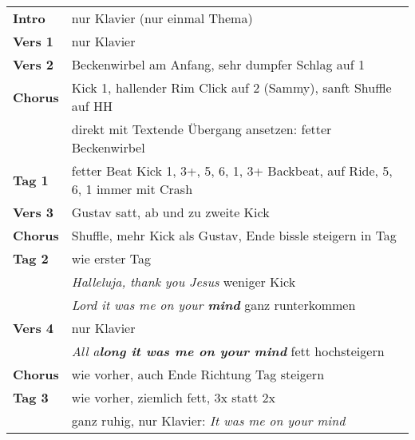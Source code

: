 

\begin{tabular}{p{1.6cm}l}
	\textbf{Intro}  & nur Klavier (nur einmal Thema)                                                  \\
	\textbf{Vers 1} & nur Klavier                                                                     \\
	\textbf{Vers 2} & Beckenwirbel am Anfang, sehr dumpfer Schlag auf 1                               \\
	\textbf{Chorus} & Kick 1, hallender Rim Click auf 2 (Sammy), sanft Shuffle auf HH                 \\
	                & direkt mit Textende Übergang ansetzen: fetter Beckenwirbel                      \\
	\textbf{Tag 1}  & fetter Beat Kick 1, 3+, 5, 6, 1, 3+ Backbeat, auf Ride, 5, 6, 1 immer mit Crash \\
	\textbf{Vers 3} & Gustav satt, ab und zu zweite Kick                                              \\
	\textbf{Chorus} & Shuffle, mehr Kick als Gustav, Ende bissle steigern in Tag                      \\
	\textbf{Tag 2}  & wie erster Tag                                                                  \\
	                & \textit{Halleluja, thank you Jesus} weniger Kick                                \\
	                & \textit{Lord it was me on your \textbf{mind}} ganz runterkommen                 \\
	\textbf{Vers 4} & nur Klavier                                                                     \\
	                & \textit{All a\textbf{long it was me on your mind}} fett hochsteigern            \\
	\textbf{Chorus} & wie vorher, auch Ende Richtung Tag steigern                                     \\
	\textbf{Tag 3}  & wie vorher, ziemlich fett, 3x statt 2x                                          \\
	                & ganz ruhig, nur Klavier: \textit{It was me on your mind}                        \\
\end{tabular}
